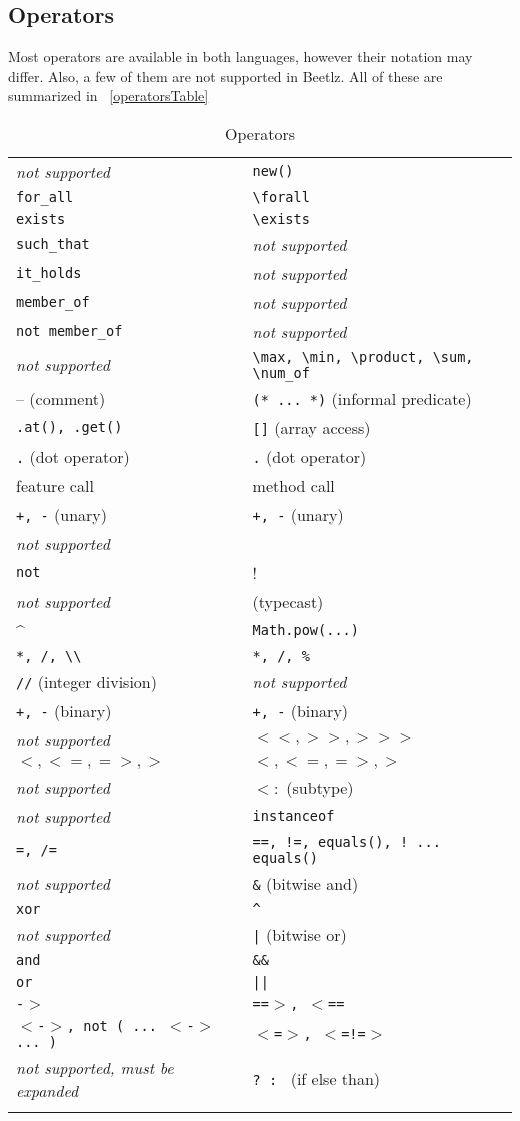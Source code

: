\documentclass[11pt]{amsart}
\newcommand{\mytablebeg}{\begin{table}[h]\centering\begin{footnotesize}
\begin{tabular}{m{7cm}|m{7cm}} }
\newcommand{\mytableend}[2]{\end{tabular}\end{footnotesize}\caption{#1} \label{#2}\end{table}}
\newcommand{\simpleline}[2]{#1 & #2\\ \hdashline}
\begin{document}
\subsection{Operators}\hfill \newline
Most operators are available in both languages, however their notation may differ. Also, a few of them are not supported in Beetlz. All of these are summarized in ~\autoref{operatorsTable} 
\mytablebeg
\simpleline{\emph{not supported}}{\texttt{new()}}
\simpleline{\texttt{for\_all}}{\texttt{\textbackslash forall}}
\simpleline{\texttt{exists}}{\texttt{\textbackslash exists}} 
\simpleline{\texttt{such\_that}}{\emph{not supported}}
\simpleline{\texttt{it\_holds}}{\emph{not supported}}
\simpleline{\texttt{member\_of}}{\emph{not supported}}
\simpleline{\texttt{not member\_of}}{\emph{not supported}}
\simpleline{\emph{not supported}}{\texttt{\textbackslash max, \textbackslash min, \textbackslash product, \textbackslash sum, \textbackslash num\_of}}
\simpleline{-- (comment)}{ \texttt{(* ... *)}  (informal predicate) }
\simpleline{\texttt{.at(), .get()}}{\texttt{[]}  (array access)}
\simpleline{\texttt{.} (dot operator)}{\texttt{.} (dot operator)}
\simpleline{feature call}{method call}
\simpleline{\texttt{+, -} (unary)}{\texttt{+, -} (unary)}
\simpleline{\emph{not supported}}{~}
\simpleline{\texttt{not}}{!}
\simpleline{\emph{not supported}}{(typecast)}
\simpleline{\^{}}{\texttt{Math.pow(...)}}
\simpleline{\texttt{*, /, \textbackslash \textbackslash}}{\texttt{*, /, \%}}
\simpleline{\texttt{//} (integer division)}{\emph{not supported}}
\simpleline{\texttt{+, -} (binary)}{\texttt{+, -} (binary)}
\simpleline{\emph{not supported}}{\texttt{$<<, >>, >>>$}}
\simpleline{$<, <=, =>, >$}{$<, <=, =>, >$}
\simpleline{\emph{not supported}}{$<:$ (subtype)}
\simpleline{\emph{not supported}}{\texttt{instanceof}}
\simpleline{\texttt{=, /=}}{\texttt{==, !=, equals(), ! ... equals()}}
\simpleline{\emph{not supported}}{\texttt{\&} (bitwise and)}
\simpleline{\texttt{xor}}{\texttt{\^}}
\simpleline{\emph{not supported}}{\texttt{|} (bitwise or)}
\simpleline{\texttt{and}}{\texttt{\&\&}}
\simpleline{\texttt{or}}{\texttt{||}}
\simpleline{\texttt{-$>$}}{\texttt{==$>$, $<$==}}
\simpleline{\texttt{$<$-$>$, not ( ... $<$-$>$ ... )}}{\texttt{$<$=$>$, $<$=!=$>$}}
\simpleline{\emph{not supported, must be expanded}}{\texttt{? : } (if else than)}
\mytableend{Operators}{operatorsTable}
\end{document}
